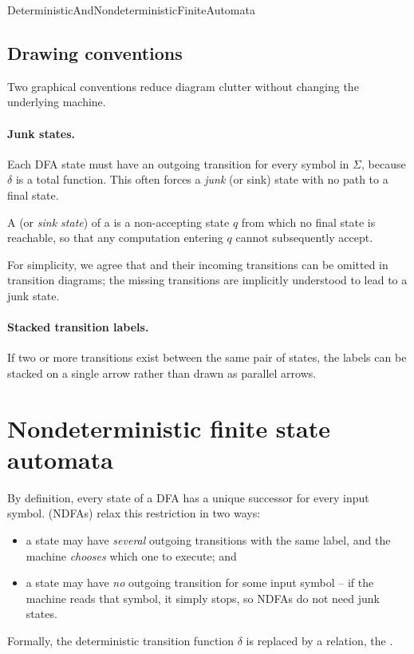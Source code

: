 \documentclass[hidelinks]{article}
\begin{document}
\begin{smodule}[title={Deterministic and Nondeterministic Finite State Automata}]{DeterministicAndNondeterministicFiniteAutomata}
\subsection{Drawing conventions}

Two graphical conventions reduce diagram clutter without changing the underlying machine.

\paragraph{Junk states.} Each DFA state must have an outgoing transition for every symbol in $\Sigma$, because $\delta$ is a total function. This often forces a \emph{junk} (or sink) state with no path to a final state.

\begin{sdefinition}[for=junk state]
A  (or \emph{sink state}) of a  is a non-accepting state $q$ from which no final state is reachable, so that any computation entering $q$ cannot subsequently accept.
\end{sdefinition}

For simplicity, we agree that  and their incoming transitions can be omitted in transition diagrams; the missing transitions are implicitly understood to lead to a junk state.

\paragraph{Stacked transition labels.} If two or more transitions exist between the same pair of states, the labels can be stacked on a single arrow rather than drawn as parallel arrows.

\section{Nondeterministic finite state automata}

By definition, every state of a DFA has a unique successor for every input symbol.  (NDFAs) relax this restriction in two ways:
\begin{itemize}
  \item a state may have \emph{several} outgoing transitions with the same label, and the machine \emph{chooses} which one to execute; and
  \item a state may have \emph{no} outgoing transition for some input symbol -- if the machine reads that symbol, it simply stops, so NDFAs do not need junk states.
\end{itemize}
Formally, the deterministic transition function $\delta$ is replaced by a relation, the .


\end{smodule}
\end{document}
